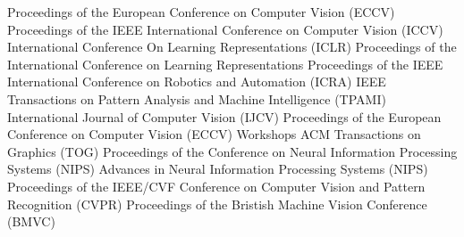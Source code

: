 Proceedings of the European Conference on Computer Vision (ECCV)
Proceedings of the IEEE International Conference on Computer Vision (ICCV)
International Conference On Learning Representations (ICLR)
Proceedings of the International Conference on Learning Representations
Proceedings of the IEEE International Conference on Robotics and Automation (ICRA)
IEEE Transactions on Pattern Analysis and Machine Intelligence (TPAMI)
International Journal of Computer Vision (IJCV)
Proceedings of the European Conference on Computer Vision (ECCV) Workshops
ACM Transactions on Graphics (TOG)
Proceedings of the Conference on Neural Information Processing Systems (NIPS)
Advances in Neural Information Processing Systems (NIPS)
Proceedings of the {IEEE}/{CVF} Conference on Computer Vision and Pattern Recognition ({CVPR})
Proceedings of the Bristish Machine Vision Conference (BMVC)